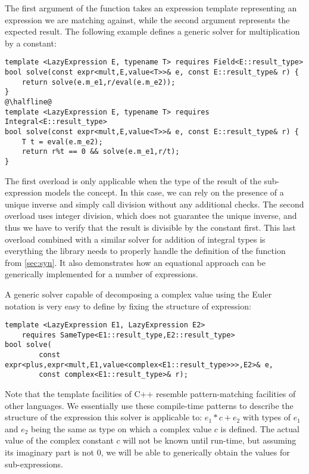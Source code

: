 The first argument of the function takes an expression template representing an 
expression we are matching against, while the second argument represents the 
expected result. The following example defines a generic solver for 
multiplication by a constant:

\begin{lstlisting}[keepspaces]
template <LazyExpression E, typename T> requires Field<E::result_type>
bool solve(const expr<mult,E,value<T>>& e, const E::result_type& r) {
    return solve(e.m_e1,r/eval(e.m_e2));
}
@\halfline@
template <LazyExpression E, typename T> requires Integral<E::result_type>
bool solve(const expr<mult,E,value<T>>& e, const E::result_type& r) {
    T t = eval(e.m_e2);
    return r%t == 0 && solve(e.m_e1,r/t);
}
\end{lstlisting}

\noindent
The first overload is only applicable when the type of the result of the 
sub-expression models the  concept. In this case, we can rely on the presence 
of a unique inverse and simply call division without any additional checks. The 
second overload uses integer division, which does not guarantee the unique 
inverse, and thus we have to verify that the result is divisible by the constant 
first. This last overload combined with a similar solver for addition of 
integral types is everything the library needs to properly handle the definition 
of the  function from \textsection\ref{sec:syn}. It also demonstrates 
how an equational approach can be generically implemented for a number of 
expressions.

A generic solver capable of decomposing a complex value using the Euler 
notation is very easy to define by fixing the structure of expression:

\begin{lstlisting}[keepspaces]
template <LazyExpression E1, LazyExpression E2> 
    requires SameType<E1::result_type,E2::result_type>
bool solve(
        const expr<plus,expr<mult,E1,value<complex<E1::result_type>>>,E2>& e, 
        const complex<E1::result_type>& r);
\end{lstlisting}

\noindent
Note that the template facilities of C++ resemble pattern-matching facilities of 
other languages. We essentially use these compile-time patterns to describe the 
structure of the expression this solver is applicable to: $e_1*c+e_2$ with types 
of $e_1$ and $e_2$ being the same as type on which a complex value $c$ is 
defined. The actual value of the complex constant $c$ will not be known until 
run-time, but assuming its imaginary part is not $0$, we will be able to 
generically obtain the values for sub-expressions.

